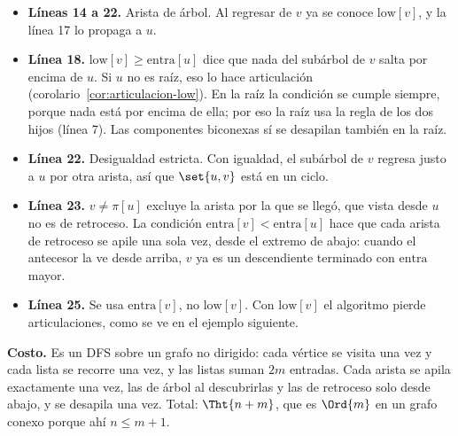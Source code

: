 \documentclass[11pt,letterpaper]{article}
\begin{document}
\begin{itemize}[itemsep=0.1em]
  \item \textbf{Líneas 14 a 22.} Arista de árbol. Al regresar de $v$
        ya se conoce $\text{low}[v]$, y la línea 17 lo propaga a $u$.
  \item \textbf{Línea 18.} $\text{low}[v] \ge \text{entra}[u]$ dice que
        nada del subárbol de $v$ salta por encima de $u$. Si $u$ no es
        raíz, eso lo hace articulación
        (corolario~\ref{cor:articulacion-low}). En la raíz la condición
        se cumple siempre, porque nada está por encima de ella; por eso
        la raíz usa la regla de los dos hijos (línea 7). Las
        componentes biconexas sí se desapilan también en la raíz.
  \item \textbf{Línea 22.} Desigualdad estricta. Con igualdad, el
        subárbol de $v$ regresa justo a $u$ por otra arista, así que
        $\set{u, v}$ está en un ciclo.
  \item \textbf{Línea 23.} $v \neq \pi[u]$ excluye la arista por la que
        se llegó, que vista desde $u$ no es de retroceso. La condición
        $\text{entra}[v] < \text{entra}[u]$ hace que cada arista de
        retroceso se apile una sola vez, desde el extremo de abajo:
        cuando el antecesor la ve desde arriba, $v$ ya es un
        descendiente terminado con $\text{entra}$ mayor.
  \item \textbf{Línea 25.} Se usa $\text{entra}[v]$, no
        $\text{low}[v]$. Con $\text{low}[v]$ el algoritmo pierde
        articulaciones, como se ve en el ejemplo siguiente.
\end{itemize}

\textbf{Costo.} Es un DFS sobre un grafo no dirigido: cada vértice se
visita una vez y cada lista se recorre una vez, y las listas suman
$2m$ entradas. Cada arista se apila exactamente una vez, las de árbol
al descubrirlas y las de retroceso solo desde abajo, y se desapila una
vez. Total: $\Tht{n + m}$, que es $\Ord{m}$ en un grafo conexo porque
ahí $n \le m + 1$.
\end{document}
